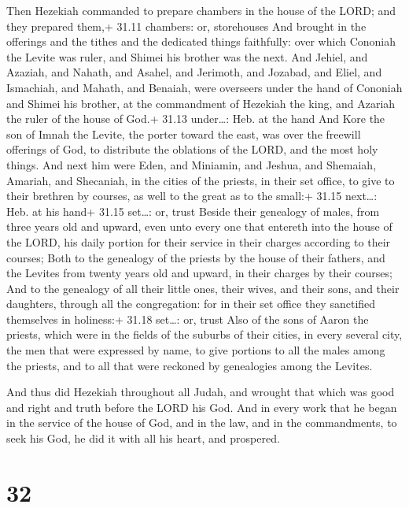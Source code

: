  Then Hezekiah commanded to prepare chambers in the house
of the LORD; and they prepared them,+ 31.11 chambers: or, storehouses
 And brought in the offerings and the tithes and the
dedicated things faithfully: over which Cononiah the Levite was ruler,
and Shimei his brother was the next.  And Jehiel, and
Azaziah, and Nahath, and Asahel, and Jerimoth, and Jozabad, and Eliel,
and Ismachiah, and Mahath, and Benaiah, were overseers under the hand of
Cononiah and Shimei his brother, at the commandment of Hezekiah the
king, and Azariah the ruler of the house of God.+ 31.13 under\ldots:
Heb. at the hand  And Kore the son of Imnah the Levite, the
porter toward the east, was over the freewill offerings of God, to
distribute the oblations of the LORD, and the most holy things.
 And next him were Eden, and Miniamin, and Jeshua, and
Shemaiah, Amariah, and Shecaniah, in the cities of the priests, in their
set office, to give to their brethren by courses, as well to the great
as to the small:+ 31.15 next\ldots: Heb. at his hand+ 31.15 set\ldots:
or, trust  Beside their genealogy of males, from three
years old and upward, even unto every one that entereth into the house
of the LORD, his daily portion for their service in their charges
according to their courses;  Both to the genealogy of the
priests by the house of their fathers, and the Levites from twenty years
old and upward, in their charges by their courses;  And to
the genealogy of all their little ones, their wives, and their sons, and
their daughters, through all the congregation: for in their set office
they sanctified themselves in holiness:+ 31.18 set\ldots: or, trust
 Also of the sons of Aaron the priests, which were in the
fields of the suburbs of their cities, in every several city, the men
that were expressed by name, to give portions to all the males among the
priests, and to all that were reckoned by genealogies among the Levites.

 And thus did Hezekiah throughout all Judah, and wrought
that which was good and right and truth before the LORD his God.
 And in every work that he began in the service of the
house of God, and in the law, and in the commandments, to seek his God,
he did it with all his heart, and prospered.

\hypertarget{section-31}{%
\section{32}\label{section-31}}

